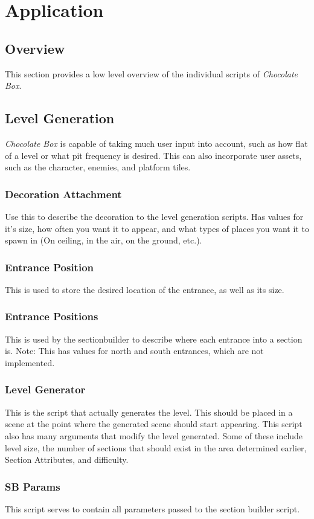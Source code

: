 \documentclass[pdftex,12pt,letter]{article}
\begin{document}
\section{Application}
\subsection{Overview}
This section provides a low level overview of the individual scripts of \textit{Chocolate Box}.
\subsection{Level Generation}
\textit{Chocolate Box} is capable of taking much user input into account, such as how flat of a level or what pit frequency is desired. This can also incorporate user assets, such as the character, enemies, and platform tiles. 
\subsubsection{Decoration Attachment}
Use this to describe the decoration to the level generation scripts. Has values for it's size, how often you want it to appear, and what types of places you want it to spawn in (On ceiling, in the air, on the ground, etc.).
\subsubsection{Entrance Position}
This is used to store the desired location of the entrance, as well as its size.
\subsubsection{Entrance Positions}
This is used by the sectionbuilder to describe where each entrance into a section is. Note: This has values for north and south entrances, which are not implemented.
\subsubsection{Level Generator}
This is the script that actually generates the level. This should be placed in a scene at the point where the generated scene should start appearing. This script also has many arguments that modify the level generated. Some of these include level size, the number of sections that should exist in the area determined earlier, Section Attributes, and difficulty. 
\subsubsection{SB Params}
This script serves to contain all parameters passed to the section builder script.
\end{document}
